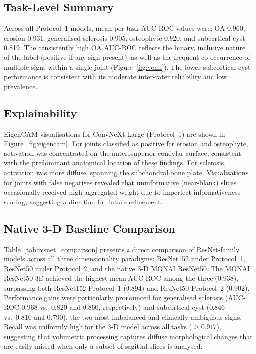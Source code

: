 \documentclass[review,12pt]{elsarticle}
\begin{document}
\subsection{Task-Level Summary}
\label{sec:task_summary}

Across all Protocol~1 models, mean per-task AUC-ROC values were: OA
0.960, erosion 0.931, generalised sclerosis 0.905, osteophyte 0.920, and
subcortical cyst 0.819. The consistently high OA AUC-ROC reflects the
binary, inclusive nature of the label (positive if any sign present),
as well as the frequent co-occurrence of multiple signs within a single
joint (Figure~\ref{fig:venn}). The lower subcortical cyst performance is consistent with its moderate
inter-rater reliability and low prevalence.

\subsection{Explainability}
\label{sec:xai_results}

EigenCAM visualisations for ConvNeXt-Large (Protocol~1) are shown in
Figure~\ref{fig:eigencam}. For joints classified as positive for erosion
and osteophyte, activation was concentrated on the anterosuperior
condylar surface, consistent with the predominant anatomical location
of these findings. For sclerosis, activation was more diffuse, spanning
the subchondral bone plate. Visualisations for joints with false
negatives revealed that uninformative (near-blank) slices occasionally
received high aggregated weight due to imperfect informativeness scoring,
suggesting a direction for future refinement.

\subsection{Native 3-D Baseline Comparison}
\label{sec:3d_baseline}

Table~\ref{tab:resnet_comparison} presents a direct comparison of
ResNet-family models across all three dimensionality paradigms:
ResNet152 under Protocol~1, ResNet50 under Protocol~2, and the native
3-D MONAI ResNet50. The MONAI ResNet50-3D achieved the highest mean
AUC-ROC among the three (0.938), surpassing both ResNet152-Protocol~1
(0.894) and ResNet50-Protocol~2 (0.902). Performance gains were
particularly pronounced for generalised sclerosis (AUC-ROC 0.968 vs.\
0.820 and 0.860, respectively) and subcortical cyst (0.846 vs.\ 0.810
and 0.790), the two most imbalanced and clinically ambiguous signs.
Recall was uniformly high for the 3-D model across all tasks ($\geq
0.917$), suggesting that volumetric processing captures diffuse
morphological changes that are easily missed when only a subset of
sagittal slices is analysed.
\end{document}
